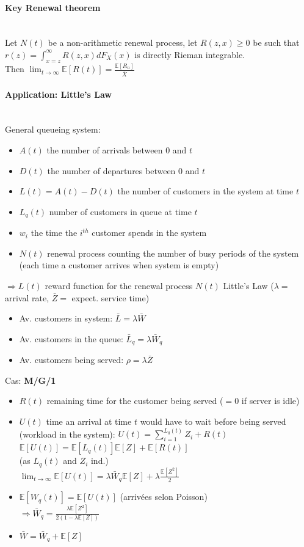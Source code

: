 \documentclass[paper=a4,fontsize=8pt,pagesize,DIV=calc]{scrartcl}
\newcounter{row}
\begin{document}
\begin{multicols}{3}
\paragraph{Key Renewal theorem}~~\\
Let $N(t)$ be a non-arithmetic renewal process, let $R(z, x) \geq 0$ be such that $r (z) =\int_{x=z}^\infty R(z,x)dF_X (x)$ is directly Rieman integrable. 
\\ Then $\lim_{t\to\infty} \mathbb{E}[R(t)]=\frac{\mathbb{E}[R_n]}{\bar{X}}$
\paragraph{Application: Little's Law}~~\\
General queueing system:
\begin{itemize}
\item $A(t)$ the number of arrivals between $0$ and $t$
\item $D(t)$ the number of departures between $0$ and $t$
\item $L(t) = A(t) - D(t)$ the number of customers in the system at time $t$
\item $L_q(t)$ number of customers in queue at time $t$
\item $w_i$ the time the $i^{th}$ customer spends in the system
\item $N(t)$ renewal process counting the number of busy periods of the system (each time a customer arrives when system is empty)
\end{itemize}
$\Rightarrow L(t)$ reward function for the renewal process $N(t)$
Little's Law ($\lambda=$arrival rate, $\bar{Z}=$ expect. service time)
\begin{itemize}
\item Av. customers in system: $\bar{L}=\lambda \bar{W}$
\item Av. customers in the queue: $\bar{L}_q=\lambda \bar{W}_q$
\item Av. customers being served: $\rho=\lambda \bar{Z}$ 
\end{itemize}
Cas: \textbf{ M/G/1}
\begin{itemize}
\item $R(t)$ remaining time for the customer being served ($=0$ if server is idle)
\item $U(t)$ time an arrival at time $t$ would have to wait before being served (workload in the system): $U(t) =\sum_{i=1}^{L_q(t)} Z_i +R(t)$
\\$\mathbb{E}[U(t)] = \mathbb{E}[L_q(t)]\mathbb{E}[Z] + \mathbb{E}[R(t)]$ \\(as $L_q(t)$ and $Z_i$ ind.)
\\$\lim_{t\to\infty}\mathbb{E}[U(t)]=\lambda \bar{W}_q\mathbb{E}[Z]+\lambda\frac{\mathbb{E}[Z^2]}{2}$
\item $\mathbb{E}[W_q(t)]=\mathbb{E}[U(t)]$ (arrivées selon Poisson)
\\$\Rightarrow \bar{W}_q= \frac{\lambda \mathbb{E}[Z^2]}{2(1 -\lambda\mathbb{E}[Z])}$
\item $\bar{W}=\bar{W}_q+\mathbb{E}[Z]$
\end{itemize}

\end{multicols}
\end{document}
